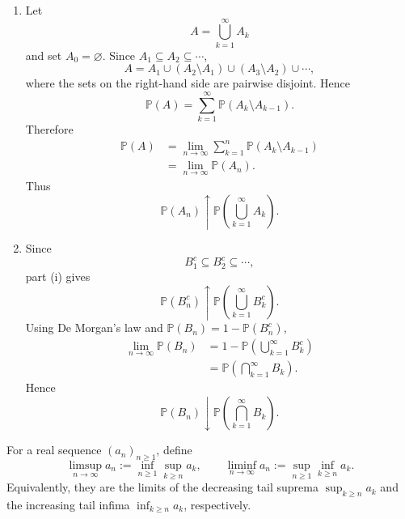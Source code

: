 \begin{proofenv}
    \begin{enumerate}[label=(\roman*)]
        \item Let
        \[
            A=\bigcup_{k=1}^{\infty}A_k
        \]
        and set $A_0=\varnothing$. Since $A_1\subseteq A_2\subseteq\cdots$,
        \[
            A
            =
            A_1
            \cup (A_2\setminus A_1)
            \cup (A_3\setminus A_2)
            \cup \cdots,
        \]
        where the sets on the right-hand side are pairwise disjoint. Hence
        \[
            \mathbb{P}(A)
            =
            \sum_{k=1}^{\infty}
            \mathbb{P}(A_k\setminus A_{k-1}).
        \]
        Therefore
        \[
        \begin{aligned}
            \mathbb{P}(A)
            &=
            \lim_{n\to\infty}
            \sum_{k=1}^{n}
            \mathbb{P}(A_k\setminus A_{k-1}) \\
            &=
            \lim_{n\to\infty}\mathbb{P}(A_n).
        \end{aligned}
        \]
        Thus
        \[
            \mathbb{P}(A_n)
            \uparrow
            \mathbb{P}\left(\bigcup_{k=1}^{\infty}A_k\right).
        \]

                \item Since
        \[
            B_1^c\subseteq B_2^c\subseteq\cdots,
        \]
        part (i) gives
        \[
            \mathbb{P}(B_n^c)
            \uparrow
            \mathbb{P}\left(\bigcup_{k=1}^{\infty}B_k^c\right).
        \]
        Using De Morgan's law and
        $\mathbb{P}(B_n)=1-\mathbb{P}(B_n^c)$,
        \[
        \begin{aligned}
            \lim_{n\to\infty}\mathbb{P}(B_n)
            &=
            1-\mathbb{P}\left(\bigcup_{k=1}^{\infty}B_k^c\right) \\
            &=
            \mathbb{P}\left(\bigcap_{k=1}^{\infty}B_k\right).
        \end{aligned}
        \]
        Hence
        \[
            \mathbb{P}(B_n)
            \downarrow
            \mathbb{P}\left(\bigcap_{k=1}^{\infty}B_k\right).
        \]
    \end{enumerate}
\end{proofenv}

\begin{definitionenv}
    For a real sequence $(a_n)_{n\ge1}$, define
    \[
        \limsup_{n\to\infty} a_n
        :=
        \inf_{n\ge1}\sup_{k\ge n} a_k,
        \qquad
        \liminf_{n\to\infty} a_n
        :=
        \sup_{n\ge1}\inf_{k\ge n} a_k.
    \]
    Equivalently, they are the limits of the decreasing tail suprema
    $\sup_{k\ge n}a_k$ and the increasing tail infima
    $\inf_{k\ge n}a_k$, respectively.
\end{definitionenv}

